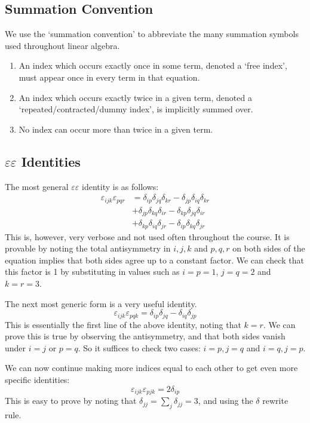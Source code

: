 \subsection{Summation Convention}
We use the `summation convention' to abbreviate the many summation symbols used throughout linear algebra.
\begin{enumerate}
	\item An index which occurs exactly once in some term, denoted a `free index', must appear once in every term in that equation.
	\item An index which occurs exactly twice in a given term, denoted a `repeated/contracted/dummy index', is implicitly summed over.
	\item No index can occur more than twice in a given term.
\end{enumerate}

\subsection{\(\varepsilon\varepsilon\) Identities}
The most general \(\varepsilon\varepsilon\) identity is as follows:
\begin{align*}
	\varepsilon_{ijk} \varepsilon_{pqr}
	 & = \delta_{ip}\delta_{jq}\delta_{kr} - \delta_{jp}\delta_{iq}\delta_{kr} \\
	 & + \delta_{jp}\delta_{kq}\delta_{ir} - \delta_{kp}\delta_{jq}\delta_{ir} \\
	 & + \delta_{kp}\delta_{iq}\delta_{jr} - \delta_{ip}\delta_{kq}\delta_{jr}
\end{align*}
This is, however, very verbose and not used often throughout the course.
It is provable by noting the total antisymmetry in \(i,j,k\) and \(p,q,r\) on both sides of the equation implies that both sides agree up to a constant factor.
We can check that this factor is 1 by substituting in values such as \(i=p=1\), \(j=q=2\) and \(k=r=3\).

The next most generic form is a very useful identity.
\[
	\varepsilon_{ijk}\varepsilon_{pqk} = \delta_{ip}\delta_{jq} - \delta_{iq}\delta_{jp}
\]
This is essentially the first line of the above identity, noting that \(k=r\).
We can prove this is true by observing the antisymmetry, and that both sides vanish under \(i=j\) or \(p=q\).
So it suffices to check two cases: \(i=p, j=q\) and \(i=q, j=p\).

We can now continue making more indices equal to each other to get even more specific identities:
\[
	\varepsilon_{ijk}\varepsilon_{pjk} = 2\delta_{ip}
\]
This is easy to prove by noting that \(\delta_{jj} = \sum_j \delta_{jj} = 3\), and using the \(\delta\) rewrite rule.

